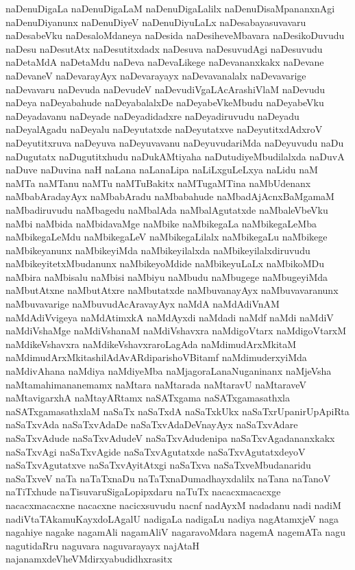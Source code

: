 {naDenuDigaLa
naDenuDigaLaM
naDenuDigaLalilx
naDenuDisaMpananxnAgi
naDenuDiyanunx
naDenuDiyeV
naDenuDiyuLaLx
naDesabayasuvavaru
naDesabeVku
naDesaloMdaneya
naDesida
naDesiheveMbavara
naDesikoDuvudu
naDesu
naDesutAtx
naDesutitxdadx
naDesuva
naDesuvudAgi
naDesuvudu
naDetaMdA
naDetaMdu
naDeva
naDevaLikege
naDevananxkakx
naDevane
naDevaneV
naDevarayAyx
naDevarayayx
naDevavanalalx
naDevavarige
naDevavaru
naDevuda
naDevudeV
naDevudiVgaLAcArashiVlaM
naDevudu
naDeya
naDeyabahude
naDeyabalalxDe
naDeyabeVkeMbudu
naDeyabeVku
naDeyadavanu
naDeyade
naDeyadidadxre
naDeyadiruvudu
naDeyadu
naDeyalAgadu
naDeyalu
naDeyutatxde
naDeyutatxve
naDeyutitxdAdxroV
naDeyutitxruva
naDeyuva
naDeyuvavanu
naDeyuvudariMda
naDeyuvudu
naDu
naDugutatx
naDugutitxhudu
naDukAMtiyaha
naDutudiyeMbudilalxda
naDuvA
naDuve
naDuvina
naH
naLana
naLanaLipa
naLiLxguLeLxya
naLidu
naM
naMTa
naMTanu
naMTu
naMTuBakitx
naMTugaMTina
naMbUdenanx
naMbabAradayAyx
naMbabAradu
naMbabahude
naMbadAjAcnxBaMgamaM
naMbadiruvudu
naMbagedu
naMbalAda
naMbalAgutatxde
naMbaleVbeVku
naMbi
naMbida
naMbidavaMge
naMbike
naMbikegaLa
naMbikegaLeMba
naMbikegaLeMdu
naMbikegaLeV
naMbikegaLilalx
naMbikegaLu
naMbikege
naMbikeyanunx
naMbikeyiMda
naMbikeyilalxda
naMbikeyilalxdiruvudu
naMbikeyitetxMbudanunx
naMbikeyoMdide
naMbikeyuLaLx
naMbikoMDu
naMbira
naMbisalu
naMbisi
naMbiyu
naMbudu
naMbugege
naMbugeyiMda
naMbutAtxne
naMbutAtxre
naMbutatxde
naMbuvanayAyx
naMbuvavaranunx
naMbuvavarige
naMbuvudAcAravayAyx
naMdA
naMdAdiVnAM
naMdAdiVvigeya
naMdAtimxkA
naMdAyxdi
naMdadi
naMdf
naMdi
naMdiV
naMdiVshaMge
naMdiVshanaM
naMdiVshavxra
naMdigoVtarx
naMdigoVtarxM
naMdikeVshavxra
naMdikeVshavxraroLagAda
naMdimudArxMkitaM
naMdimudArxMkitashilAdAvARdiparishoVBitamf
naMdimuderxyiMda
naMdivAhana
naMdiya
naMdiyeMba
naMjagoraLanaNuganinanx
naMjeVsha
naMtamahimananemamx
naMtara
naMtarada
naMtaravU
naMtaraveV
naMtavigarxhA
naMtayARtamx
naSATxgama
naSATxgamasathxla
naSATxgamasathxlaM
naSaTx
naSaTxdA
naSaTxkUkx
naSaTxrUpanirUpApiRta
naSaTxvAda
naSaTxvAdaDe
naSaTxvAdaDeVnayAyx
naSaTxvAdare
naSaTxvAdude
naSaTxvAdudeV
naSaTxvAdudenipa
naSaTxvAgadananxkakx
naSaTxvAgi
naSaTxvAgide
naSaTxvAgutatxde
naSaTxvAgutatxdeyoV
naSaTxvAgutatxve
naSaTxvAyitAtxgi
naSaTxva
naSaTxveMbudanaridu
naSaTxveV
naTa
naTaTxnaDu
naTaTxnaDumadhayxdalilx
naTana
naTanoV
naTiTxhude
naTisuvaruSigaLopipxdaru
naTuTx
nacacxmacacxge
nacacxmacacxne
nacacxne
nacicxsuvudu
nacnf
nadAyxM
nadadanu
nadi
nadiM
nadiVtaTAkamuKayxdoLAgalU
nadigaLa
nadigaLu
nadiya
nagAtamxjeV
naga
nagahiye
nagake
nagamAli
nagamAliV
nagaravoMdara
nagemA
nagemATa
nagu
nagutidaRru
naguvara
naguvarayayx
najAtaH
najanamxdeVheVMdirxyabudidhxrasitx
}
